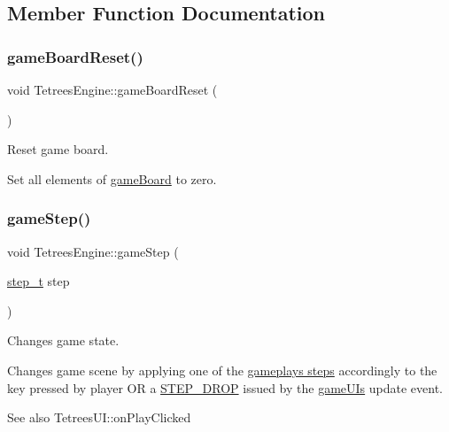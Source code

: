 \subsection{Member Function Documentation}
\mbox{\label{classTetreesEngine_ad28ed83be446f74c87d55d79cc64e6ef}} 
\subsubsection{\texorpdfstring{game\+Board\+Reset()}{gameBoardReset()}}
{\footnotesize\ttfamily void Tetrees\+Engine\+::game\+Board\+Reset (\begin{DoxyParamCaption}{ }\end{DoxyParamCaption})\hspace{0.3cm}{\ttfamily [private]}}



Reset game board. 

Set all elements of \hyperlink{classTetreesEngine_a37d082a7816d6731b2703dd6d1a1cb97}{game\+Board} to zero. \mbox{\label{classTetreesEngine_a33e9983a618b3538640b6bd987304b8b}} 
\subsubsection{\texorpdfstring{game\+Step()}{gameStep()}}
{\footnotesize\ttfamily void Tetrees\+Engine\+::game\+Step (\begin{DoxyParamCaption}\item[{\hyperlink{TetreesDefs_8hpp_a4d5a793092a473f85b4c1f7faf62afed}{step\+\_\+t}}]{step }\end{DoxyParamCaption})}



Changes game state. 

Changes game scene by applying one of the \hyperlink{TetreesDefs_8hpp_a4d5a793092a473f85b4c1f7faf62afed}{gameplay\textquotesingle{}s steps} accordingly to the key pressed by player OR a \hyperlink{TetreesDefs_8hpp_a4d5a793092a473f85b4c1f7faf62afed}{S\+T\+E\+P\+\_\+\+D\+R\+OP} issued by the \hyperlink{classTetreesEngine_a01bf1d438236d5f57129ffb22adf59ce}{game\+UI\textquotesingle{}s} update event. \begin{DoxySeeAlso}{See also}
Tetrees\+U\+I\+::on\+Play\+Clicked 
\end{DoxySeeAlso}


